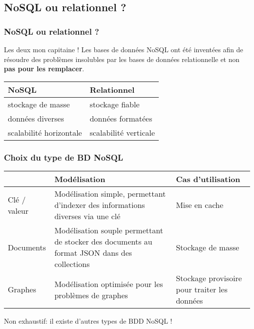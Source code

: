     \subsection{NoSQL ou relationnel ?}
        \begin{frame}
            \frametitle{NoSQL ou relationnel ?}

            \begin{alertblock}{Les deux mon capitaine !}
                Les bases de données NoSQL ont été inventées afin de résoudre des problèmes insolubles par les bases de données relationnelle et non \textbf{pas pour les remplacer}.
            \end{alertblock}

            \vspace{20px}

            \begin{tabular}{|l|l|}
                \hline
                \textbf{NoSQL} & \textbf{Relationnel} \\ \hline\hline
                stockage de masse & stockage fiable \\ \hline
                données diverses & données formatées \\ \hline
                scalabilité horizontale & scalabilité verticale \\ \hline
            \end{tabular}
        \end{frame}

        \begin{frame}
            \frametitle{Choix du type de BD NoSQL}

            \begin{tabular}{|p{}|p{}|p{}|}
                \hline
                & Modélisation & Cas d'utilisation \\\hline
                Clé / valeur
                & Modélisation simple, permettant d'indexer des informations diverses via une clé
                & Mise en cache  \\\hline
                Documents
                & Modélisation souple permettant de stocker des documents au format JSON dans des collections
                & Stockage de masse \\\hline
                Graphes
                & Modélisation optimisée pour les problèmes de graphes
                & Stockage provisoire pour traiter les données \\\hline
            \end{tabular}

            \vspace{10px}

            Non exhaustif: il existe d'autres types de BDD NoSQL !
        \end{frame}
